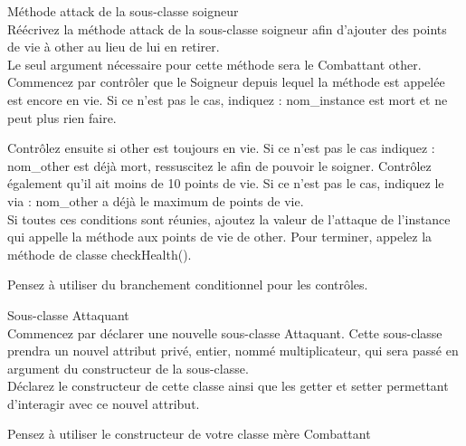 \begin{Exercice}[10 minutes] Méthode attack de la sous-classe soigneur \\

Réécrivez la méthode attack de la sous-classe soigneur afin d'ajouter des points de vie à other au lieu de lui en retirer. \\

Le seul argument nécessaire pour cette méthode sera le Combattant other. \\

Commencez par contrôler que le Soigneur depuis lequel la méthode est appelée est encore en vie. Si ce n'est pas le cas, indiquez : nom\_instance est mort et ne peut plus rien faire.

Contrôlez ensuite si other est toujours en vie. Si ce n'est pas le cas indiquez : nom\_other est déjà mort, ressuscitez le afin de pouvoir le soigner. Contrôlez également qu'il ait moins de 10 points de vie. Si ce n'est pas le cas, indiquez le via : nom\_other a déjà le maximum de points de vie. \\

Si toutes ces conditions sont réunies, ajoutez la valeur de l'attaque de l'instance qui appelle la méthode aux points de vie de other. Pour terminer, appelez la méthode de classe checkHealth().

\begin{conseil}
Pensez à utiliser du branchement conditionnel pour les contrôles. \\
\end{conseil}

\begin{solution}
	
\end{solution}

\end{Exercice}

\begin{Exercice}[5 minutes] Sous-classe Attaquant \\

Commencez par déclarer une nouvelle sous-classe Attaquant. Cette sous-classe prendra un nouvel attribut privé, entier, nommé multiplicateur, qui sera passé en argument du constructeur de la sous-classe. \\

Déclarez le constructeur de cette classe ainsi que les getter et setter permettant d'interagir avec ce nouvel attribut. \\

\begin{conseil}
Pensez à utiliser le constructeur de votre classe mère Combattant
\end{conseil}

\begin{solution}
	
\end{solution}

\end{Exercice}

